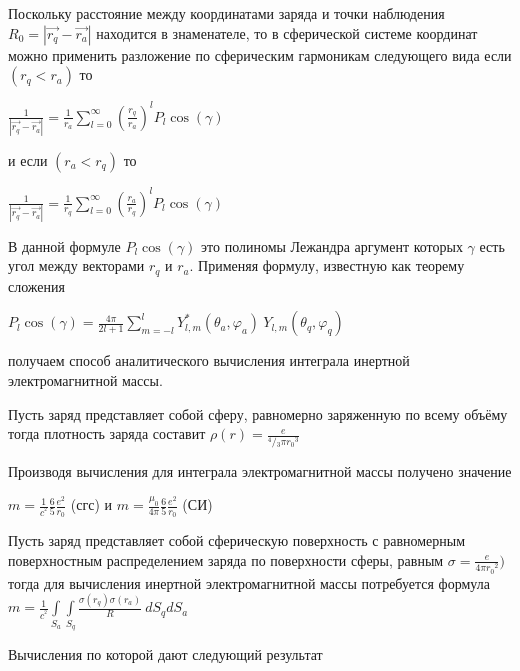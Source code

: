 \documentclass{article}
\begin{document}
Поскольку расстояние между координатами заряда и точки наблюдения ${{R}_{0}}=\left|\overrightarrow{r_{q}} - \overrightarrow{r_{a}}\right|$ находится в знаменателе, то в сферической системе координат можно применить разложение по сферическим гармоникам следующего вида  \cite{flugge} если $\left( {{r}_{q}}<{{r}_{a}} \right)$ то

$\frac{1}{\left| \overrightarrow{{{r}_{q}}}-\overrightarrow{{{r}_{a}}} \right|}=\frac{1}{{{r}_{a}}}\sum\limits_{l=0}^{\infty }{{{\left( \frac{{{r}_{q}}}{{{r}_{a}}} \right)}^{l}}{{P}_{l}} \cos \left( \gamma  \right)}$

и если $\left( {{r}_{a}}<{{r}_{q}} \right)$ то

$\frac{1}{\left| \overrightarrow{{{r}_{q}}}-\overrightarrow{{{r}_{a}}} \right|}=\frac{1}{{{r}_{q}}}\sum\limits_{l=0}^{\infty }{{{\left( \frac{{{r}_{a}}}{{{r}_{q}}} \right)}^{l}}{{P}_{l}} \cos \left( \gamma  \right)}$

В данной формуле ${{P}_{l}} \cos \left( \gamma  \right)$ это полиномы Лежандра аргумент которых $\gamma$ есть угол между векторами ${{r}_{q}}$  и ${{r}_{a}}$. Применяя формулу, известную как теорему сложения

${{P}_{l}}\cos \left( \gamma  \right)=\frac{4\pi }{2l+1}\sum\limits_{m=-l}^{l}{Y_{l,m}^{*}\left( {{\theta }_{a}},{{\varphi }_{a}} \right)}\ {{Y}_{l,m}}\left( {{\theta }_{q}},{{\varphi }_{q}} \right)$

получаем способ аналитического вычисления интеграла инертной электромагнитной массы.

Пусть заряд представляет собой сферу, равномерно заряженную по всему объёму тогда плотность заряда составит $\rho \left( r \right)=\frac{e}{{}^{4}/{}_{3}\pi {{r}_{0}}^{3}}$

Производя вычисления для интеграла электромагнитной массы получено значение 

$m =\frac{1}{{{c}^{^{2}}}}\frac{6}{5}\frac{e^2}{{{r}_{0}}}$ (сгс) и
$m =\frac{{{\mu }_{0}}}{4\pi }\frac{6}{5}\frac{e^2}{{{r}_{0}}}$ (СИ)

Пусть заряд представляет собой сферическую поверхность с равномерным поверхностным распределением заряда по поверхности сферы, равным $\sigma=\frac{e}{4\pi {{r}_{0}}^{2}})$ тогда для вычисления инертной электромагнитной массы потребуется формула
$m=\frac{1}{{{c}^{^{2}}}}\int\limits_{{{S}_{a}}}{\int\limits_{{{S}_{q}}}{\frac{\sigma \left( {{r}_{q}} \right)\sigma \left( {{r}_{a}} \right)}{R}}}\ d{{S}_{q}}d{{S}_{a}}$

Вычисления по которой дают следующий результат
\end{document}
